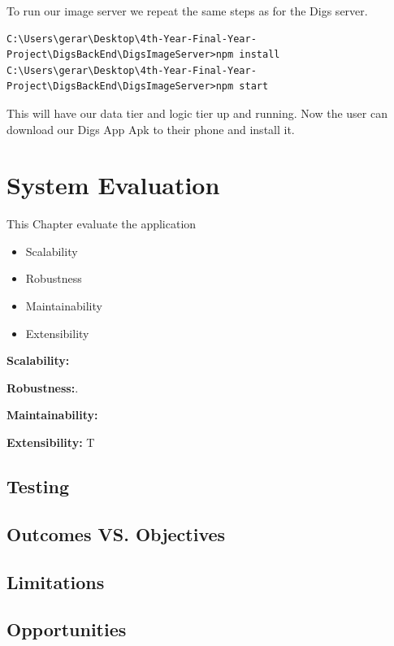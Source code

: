 \noindent To run our image server we repeat the same steps as for the Digs server.

\begin{verbatim}
C:\Users\gerar\Desktop\4th-Year-Final-Year-Project\DigsBackEnd\DigsImageServer>npm install
C:\Users\gerar\Desktop\4th-Year-Final-Year-Project\DigsBackEnd\DigsImageServer>npm start
\end{verbatim}

\noindent This will have our data tier and logic tier up and running. Now the user can download our Digs App Apk to their phone and install it.  








\chapter{System Evaluation}
This Chapter evaluate the application
\begin{itemize}
    \item Scalability
    \item Robustness
    \item Maintainability
    \item Extensibility
\end{itemize}

\par \textbf{Scalability:} 

\par \textbf{Robustness:}.

\par \textbf{Maintainability:}

\par \textbf{Extensibility:} T

\section{Testing}

\section{Outcomes VS. Objectives}

\section{Limitations}

\section{Opportunities}


